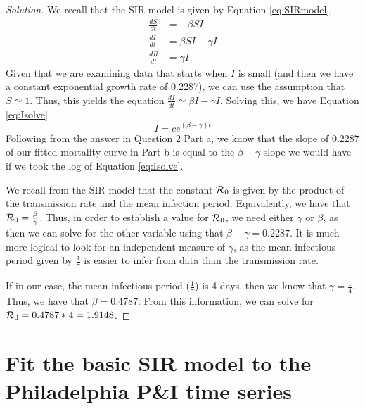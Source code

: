 \documentclass[12pt]{article}\usepackage[]{graphicx}\usepackage[]{color}
\begin{document}
\begin{enumerate}[(a)]
  {\color{blue} \begin{proof}[Solution]
  {\color{magenta}
  We recall that the SIR model is given by Equation \ref{eq:SIRmodel}.
\begin{equation}
\label{eq:SIRmodel}
\begin{aligned}
\frac{dS}{dt}&=-\beta SI \\
\frac{dI}{dt}&=\beta SI - \gamma I \\
\frac{dR}{dt}&=\gamma I 
\end{aligned}
\end{equation}
Given that we are examining data that starts when $I$ is small (and then we have a constant exponential growth rate of 0.2287), we can use the assumption that $S\simeq 1$. Thus, this yields the equation $\frac{dI}{dt}\simeq\beta I - \gamma I$. Solving this, we have Equation \ref{eq:Isolve}
\begin{equation}
\label{eq:Isolve}
I=ce^{(\beta - \gamma)t}
\end{equation}
Following from the answer in Question 2 Part a, we know that the slope of 0.2287 of our fitted mortality curve in Part b is equal to the $\beta - \gamma$ slope we would have if we took the log of Equation \ref{eq:Isolve}.

We recall from the SIR model that the constant ${\cal R}_0$ is given by the product of the transmission rate and the mean infection period. Equivalently, we have that ${\cal R}_0 = \frac{\beta}{\gamma}$. Thus, in order to establish a value for ${\cal R}_0$, we need either $\gamma$ or $\beta$, as then we can solve for the other variable using that $\beta - \gamma = 0.2287$. It is much more logical to look for an independent measure of $\gamma$, as the mean infectious period given by $\frac{1}{\gamma}$ is easier to infer from data than the transmission rate. 

If in our case, the mean infectious period ($\frac{1}{\gamma}$) is 4 days, then we know that $\gamma = \frac{1}{4}$. Thus, we have that $\beta=0.4787$. From this information, we can solve for ${\cal R}_0 = 0.4787*4 = 1.9148$.
  }
  \end{proof}
  }

\end{enumerate}

\section{Fit the basic SIR model to the Philadelphia P\&I time series}
\end{document}
